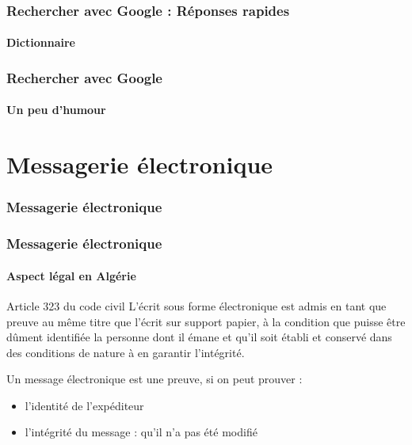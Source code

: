 \documentclass[xcolor=table]{beamer}
\begin{document}
\begin{frame}
\frametitle{Rechercher avec Google : Réponses rapides}
\framesubtitle{Dictionnaire}

\begin{center}
\end{center}

\end{frame}

\begin{frame}
\frametitle{Rechercher avec Google}
\framesubtitle{Un peu d'humour}

\begin{center}
\end{center}

\end{frame}


\section{Messagerie électronique}

\begin{frame}
\frametitle{Messagerie électronique}

\begin{center}
\end{center}

\end{frame}

\begin{frame}
\frametitle{Messagerie électronique}
\framesubtitle{Aspect légal en Algérie}


\begin{block}{Article 323 du code civil}
	L'écrit sous forme électronique est admis en tant que preuve au même titre que l'écrit sur support papier, à la condition que puisse être dûment identifiée la personne dont il émane et qu'il soit établi et conservé dans des conditions de nature à en garantir l'intégrité.
\end{block}

Un message électronique est une preuve, si on peut prouver : 
\begin{itemize}
	\item l'identité de l'expéditeur 
	\item l'intégrité du message : qu'il n'a pas été modifié 
\end{itemize} 

\end{frame}
\end{document}
